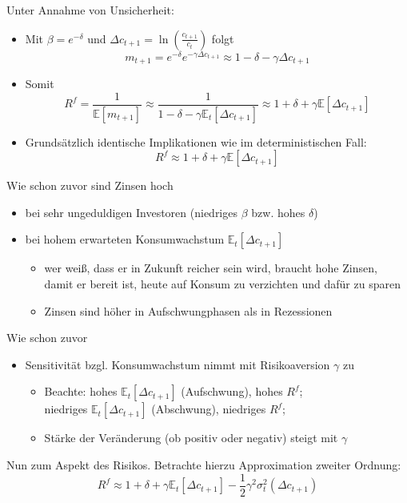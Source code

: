\documentclass[12pt]{extreport} %
\theoremstyle{named}
\theoremstyle{nnamed}
\theoremstyle{itshape}
\theoremstyle{normal}
\begin{document}
	
Unter Annahme von Unsicherheit:	
\begin{itemize}
	\item Mit $\beta = e^{-\delta}$ und $\Delta c_{t+1} = \ln \left( \frac{c_{t+1}}{c_t} \right)$ folgt
		$$ m_{t+1} = e^{-\delta} e^{-\gamma \Delta c_{t+1}} \approx 1 - \delta - \gamma \Delta c_{t+1} $$
	\item Somit
		$$ R^f = \frac{1}{\mathbb{E}[m_{t+1}]} \approx \frac{1}{1 - \delta - \gamma \mathbb{E}_t[\Delta c_{t+1}]} \approx 1 + \delta + \gamma \mathbb{E}[\Delta c_{t+1}] $$
	\item Grundsätzlich identische Implikationen wie im deterministischen Fall:
		$$ R^f \approx 1 + \delta + \gamma \mathbb{E} [\Delta c_{t+1}] $$
\end{itemize}
Wie schon zuvor sind Zinsen hoch
\begin{itemize}
			\item bei sehr ungeduldigen Investoren (niedriges $\beta$ bzw. hohes $\delta$)
			\item bei hohem erwarteten Konsumwachstum $\mathbb{E}_t[\Delta c_{t+1}]$
				\begin{itemize}
					\item wer weiß, dass er in Zukunft reicher sein wird, braucht hohe Zinsen, damit er bereit ist, heute auf Konsum zu verzichten und dafür zu sparen
					\item Zinsen sind höher in Aufschwungphasen als in Rezessionen
				\end{itemize}
\end{itemize}
Wie schon zuvor
\begin{itemize}
	\item Sensitivität bzgl. Konsumwachstum nimmt mit Risikoaversion $\gamma$ zu
		\begin{itemize}
			\item Beachte: hohes $\mathbb{E}_t[\Delta c_{t+1}]$ (Aufschwung), hohes $R^f$; ~\\
				niedriges $\mathbb{E}_t[\Delta c_{t+1}]$ (Abschwung), niedriges $R^f$;
			\item Stärke der Veränderung (ob positiv  oder negativ) steigt mit $\gamma$
		\end{itemize}
\end{itemize}

Nun zum Aspekt des Risikos. Betrachte hierzu Approximation zweiter Ordnung:
	$$	R^f \approx 1 + \delta + \gamma \mathbb{E}_t[\Delta c_{t+1}] - \frac{1}{2} \gamma^2 \sigma^2_t (\Delta c_{t+1}) $$ 
	
~\newpage
\end{document}
